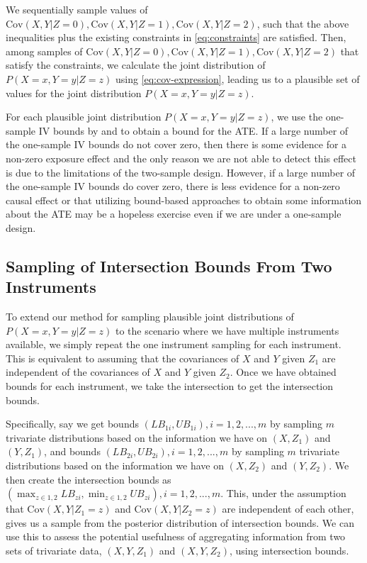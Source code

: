 \documentclass[
]{article}
\theoremstyle{plain}
\begin{document}
We sequentially sample values of \(\text{Cov}(X, Y | Z = 0), \text{Cov}(X, Y | Z = 1), \text{Cov}(X, Y | Z = 2)\), such that the above inequalities plus the existing constraints in \eqref{eq:constraints} are satisfied. Then, among samples of \(\text{Cov}(X, Y | Z = 0), \text{Cov}(X, Y | Z = 1), \text{Cov}(X, Y | Z = 2)\) that satisfy the constraints, we calculate the joint distribution of \(P(X = x, Y = y | Z = z)\) using \eqref{eq:cov-expression}, leading us to a plausible set of values for the joint distribution \(P(X = x, Y = y | Z = z)\).

For each plausible joint distribution \(P(X = x, Y = y | Z = z)\), we use the one-sample IV bounds by \textcite{balke_bounds_1997} and \textcite{richardson_ace_2014} to obtain a bound for the ATE. If a large number of the one-sample IV bounds do not cover zero, then there is some evidence for a non-zero exposure effect and the only reason we are not able to detect this effect is due to the limitations of the two-sample design. However, if a large number of the one-sample IV bounds do cover zero, there is less evidence for a non-zero causal effect or that utilizing bound-based approaches to obtain some information about the ATE may be a hopeless exercise even if we are under a one-sample design.

\hypertarget{sampling-of-intersection-bounds-from-two-instruments}{%
\subsection{\texorpdfstring{Sampling of Intersection Bounds From Two Instruments \label{sample-intersection-bounds}}{Sampling of Intersection Bounds From Two Instruments }}\label{sampling-of-intersection-bounds-from-two-instruments}}

To extend our method for sampling plausible joint distributions of \(P(X = x, Y = y | Z = z)\) to the scenario where we have multiple instruments available, we simply repeat the one instrument sampling for each instrument. This is equivalent to assuming that the covariances of \(X\) and \(Y\) given \(Z_1\) are independent of the covariances of \(X\) and \(Y\) given \(Z_2\). Once we have obtained bounds for each instrument, we take the intersection to get the intersection bounds.

Specifically, say we get bounds \((LB_{1i},UB_{1i}),i = 1,2,...,m\) by sampling \(m\) trivariate distributions based on the information we have on \((X,Z_1)\) and \((Y,Z_1)\), and bounds \((LB_{2i}, UB_{2i}),i = 1,2,...,m\) by sampling \(m\) trivariate distributions based on the information we have on \((X,Z_2)\) and \((Y,Z_2)\). We then create the intersection bounds as \(\left(\max_{z \in {1,2}} LB_{zi}, \min_{z \in {1,2}} UB_{zi}\right), i = 1, 2, ..., m\). This, under the assumption that \(\text{Cov}(X, Y | Z_1 = z)\) and \(\text{Cov}(X, Y | Z_2 = z)\) are independent of each other, gives us a sample from the posterior distribution of intersection bounds. We can use this to assess the potential usefulness of aggregating information from two sets of trivariate data, \((X, Y, Z_1)\) and \((X, Y, Z_2)\), using intersection bounds.
\end{document}
